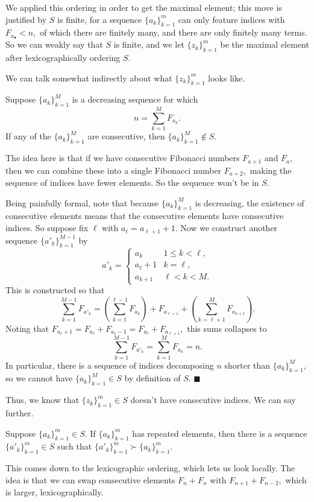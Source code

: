 We applied this ordering in order to get the maximal element; this move is justified by $S$ is finite, for a sequence $\{a_k\}_{k=1}^m$ can only feature indices with $F_{a_\bullet}<n,$ of which there are finitely many, and there are only finitely many terms. So we can weakly say that $S$ is finite, and we let $\{z_k\}_{k=1}^m$ be the maximal element after lexicographically ordering $S.$

We can talk somewhat indirectly about what $\{z_k\}_{k=1}^m$ looks like.
\begin{lemma}
    Suppose $\{a_k\}_{k=1}^M$ is a decreasing sequence for which
    \[n=\sum_{k=1}^MF_{a_k}.\]
    If any of the $\{a_k\}_{k=1}^M$ are consecutive, then $\{a_k\}_{k=1}^M\notin S.$
\end{lemma}
The idea here is that if we have consecutive Fibonacci numbers $F_{a+1}$ and $F_a,$ then we can combine these into a single Fibonacci number $F_{a+2},$ making the sequence of indices have fewer elements. So the sequence won't be in $S.$

Being painfully formal, note that because $\{a_k\}_{k=1}^M$ is decreasing, the existence of consecutive elements means that the consecutive elements have consecutive indices. So suppose fix $\ell$ with $a_\ell=a_{\ell+1}+1.$ Now we construct another sequence $\{a'_k\}_{k=1}^{M-1}$ by
\[a'_k=\begin{cases}
    a_k & 1\le k<\ell, \\
    a_\ell+1 & k=\ell, \\
    a_{k+1} & \ell<k<M.
\end{cases}\]
This is constructed so that
\[\sum_{k=1}^{M-1}F_{a'_k}=\left(\sum_{k=1}^{\ell-1}F_{a_k}\right)+F_{a_{\ell+1}}+\left(\sum_{k=\ell+1}^MF_{a_{k+1}}\right).\]
Noting that $F_{a_\ell+1}=F_{a_\ell}+F_{a_\ell-1}=F_{a_\ell}+F_{a_{\ell+1}},$ this sums collapses to
\[\sum_{k=1}^{M-1}F_{a'_k}=\sum_{k=1}^MF_{a_k}=n.\]
In particular, there is a sequence of indices decomposing $n$ shorter than $\{a_k\}_{k=1}^M,$ so we cannot have $\{a_k\}_{k=1}^M\in S$ by definition of $S.$ $\blacksquare$

Thus, we know that $\{z_k\}_{k=1}^m\in S$ doesn't have consecutive indices. We can say further.
\begin{lemma}
    Suppose $\{a_k\}_{k=1}^m\in S.$ If $\{a_k\}_{k=1}^m$ has repeated elements, then there is a sequence $\{a'_k\}_{k=1}^m\in S$ such that $\{a'_k\}_{k=1}^m\succ\{a_k\}_{k=1}^m.$
\end{lemma}
This comes down to the lexicographic ordering, which lets us look locally. The idea is that we can swap consecutive elements $F_n+F_n$ with $F_{n+1}+F_{n-2},$ which is larger, lexicographically.

